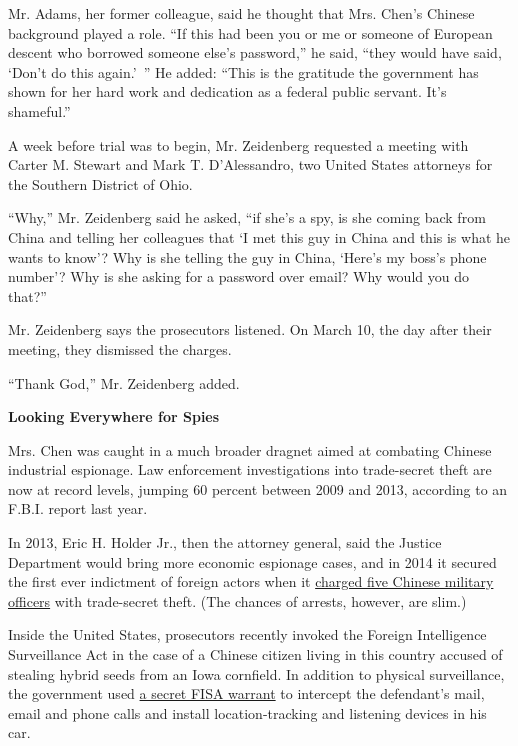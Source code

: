 Mr. Adams, her former colleague, said he thought that Mrs. Chen's
Chinese background played a role. ``If this had been you or me or
someone of European descent who borrowed someone else's password,'' he
said, ``they would have said, `Don't do this again.'~'' He added: ``This
is the gratitude the government has shown for her hard work and
dedication as a federal public servant. It's shameful.''

A week before trial was to begin, Mr. Zeidenberg requested a meeting
with Carter M. Stewart and Mark T. D'Alessandro, two United States
attorneys for the Southern District of Ohio.

``Why,'' Mr. Zeidenberg said he asked, ``if she's a spy, is she coming
back from China and telling her colleagues that `I met this guy in China
and this is what he wants to know'? Why is she telling the guy in China,
`Here's my boss's phone number'? Why is she asking for a password over
email? Why would you do that?''

Mr. Zeidenberg says the prosecutors listened. On March 10, the day after
their meeting, they dismissed the charges.

``Thank God,'' Mr. Zeidenberg added.

\textbf{Looking Everywhere for Spies}

Mrs. Chen was caught in a much broader dragnet aimed at combating
Chinese industrial espionage. Law enforcement investigations into
trade-secret theft are now at record levels, jumping 60 percent between
2009 and 2013, according to an F.B.I. report last year.

In 2013, Eric H. Holder Jr., then the attorney general, said the Justice
Department would bring more economic espionage cases, and in 2014 it
secured the first ever indictment of foreign actors when it
\href{http://www.nytimes.com/2014/05/20/us/us-to-charge-chinese-workers-with-cyberspying.html}{charged
five Chinese military officers} with trade-secret theft. (The chances of
arrests, however, are slim.)

Inside the United States, prosecutors recently invoked the Foreign
Intelligence Surveillance Act in the case of a Chinese citizen living in
this country accused of stealing hybrid seeds from an Iowa cornfield. In
addition to physical surveillance, the government used
\href{http://justsecurity.org/wp-content/uploads/2015/03/Hailong-Order-Denying-Defendants-Motion-to-Compel.pdf}{a
secret FISA warrant} to intercept the defendant's mail, email and phone
calls and install location-tracking and listening devices in his car.

